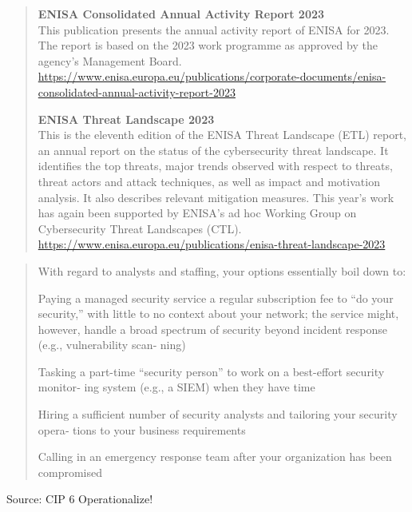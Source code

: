 \documentclass[Screen16to9,17pt]{foils}
\begin{document}
\begin{quote}
{\bf ENISA Consolidated Annual Activity Report 2023}\\
This publication presents the annual activity report of ENISA for 2023. The report is based on the 2023 work programme as approved by the agency's Management Board.\\
\url{https://www.enisa.europa.eu/publications/corporate-documents/enisa-consolidated-annual-activity-report-2023}

{\bf ENISA Threat Landscape 2023}\\
This is the eleventh edition of the ENISA Threat Landscape (ETL) report, an annual report on the status of the cybersecurity threat landscape. It identifies the top threats, major trends observed with respect to threats, threat actors and attack techniques, as well as impact and motivation analysis. It also describes relevant mitigation measures. This year’s work has again been supported by ENISA’s ad hoc Working Group on Cybersecurity Threat Landscapes (CTL).\\
\url{https://www.enisa.europa.eu/publications/enisa-threat-landscape-2023}
\end{quote}




\begin{quote}

With regard to analysts and staffing, your options essentially boil down to:
\begin{list2}
\item Paying a managed security service a regular subscription fee to “do your security,”
  with little to no context about your network; the service might, however, handle a
  broad spectrum of security beyond incident response (e.g., vulnerability scan‐
  ning)
\item Tasking a part-time “security person” to work on a best-effort security monitor‐
  ing system (e.g., a SIEM) when they have time
\item Hiring a sufficient number of security analysts and tailoring your security opera‐
tions to your business requirements
\item Calling in an emergency response team after your organization has been compromised
\end{list2}
\end{quote}
Source: CIP 6 Operationalize!
\end{document}

